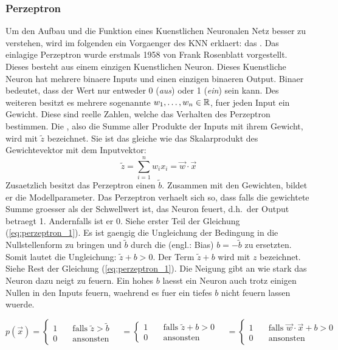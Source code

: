 \documentclass[../main]{subfiles}
\begin{document}
\subsubsection{Perzeptron}
Um den Aufbau und die Funktion eines Kuenstlichen Neuronalen Netz besser zu
verstehen, wird im folgenden ein Vorgaenger des KNN erklaert: das .
\para{}
Das einlagige Perzeptron wurde erstmals 1958 von Frank Rosenblatt vorgestellt. Dieses
besteht aus einem einzigen Kuenstlichen Neuron. Dieses Kuenstliche Neuron
hat mehrere binaere Inputs und einen einzigen binaeren Output. Binaer
bedeutet, dass der Wert nur entweder 0 (\textit{aus}) oder 1 (\textit{ein}) sein
kann. Des weiteren besitzt es mehrere sogenannte  $w_1, \ldots,
w_n \in \mathbb{R}$, fuer jeden Input ein Gewicht.
Diese sind reelle Zahlen, welche das Verhalten des Perzeptron bestimmen.
Die , also die Summe aller Produkte der Inputs mit
ihrem Gewicht, wird mit $\tilde{z}$ bezeichnet.
Sie ist das gleiche wie das Skalarprodukt des Gewichtevektor mit dem Inputvektor:
\begin{equation*}
  \tilde{z} = \sum_{i=1}^{n} w_i x_i = \vec{w} \cdot \vec{x}
\end{equation*}
\para{}
Zusaetzlich besitzt das Perzeptron einen  $\tilde{b}$.
Zusammen mit den Gewichten, bildet er die Modellparameter.
Das Perzeptron verhaelt sich so, dass falls die gewichtete Summe groesser als der
Schwellwert ist, das Neuron feuert, d.h.\ der Output betraegt 1. Andernfalls ist er 0.
Siehe erster Teil der Gleichung (\ref{eq:perzeptron_1}).
Es ist gaengig die Ungleichung der Bedingung in die Nullstellenform zu bringen
und $\tilde{b}$ durch die  (engl.: Bias)
$b = -\tilde{b}$ zu ersetzten. Somit lautet die Ungleichung: $\tilde{z} + b
> 0$. Der Term $\tilde{z} + b$ wird mit $z$ bezeichnet. Siehe Rest der Gleichung (\ref{eq:perzeptron_1}).
Die Neigung gibt an wie stark das Neuron dazu neigt zu feuern. Ein hohes $b$
laesst ein Neuron auch trotz einigen Nullen in den Inputs feuern, waehrend es
fuer ein tiefes $b$ nicht feuern lassen wuerde.

\begin{equation}\label{eq:perzeptron_1}
  p(\vec{x}) =
  \begin{cases}
    1 & \quad \text{falls } \tilde{z} > \tilde{b}\\
    0 & \quad \text{ansonsten}
  \end{cases}
  \quad =
  \begin{cases}
    1 & \quad \text{falls } \tilde{z} + b > 0\\
    0 & \quad \text{ansonsten}
  \end{cases}
  \quad =
  \begin{cases}
    1 & \quad\text{falls } \vec{w} \cdot \vec{x} + b > 0\\
    0 & \quad\text{ansonsten}
  \end{cases}
\end{equation}
\end{document}
